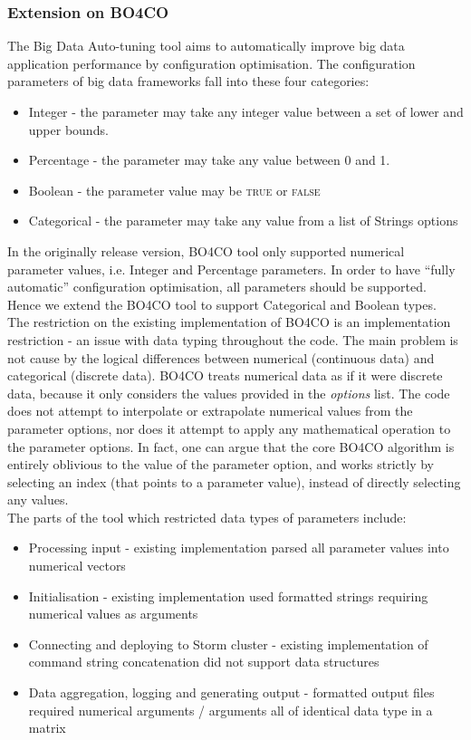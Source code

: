 \newpage
\subsubsection{Extension on BO4CO}
The Big Data Auto-tuning tool aims to automatically improve big data application performance by configuration optimisation. The configuration parameters of big data frameworks fall into these four categories:
\begin{itemize}
\item Integer - the parameter may take any integer value between a set of lower and upper bounds.
\item Percentage - the parameter may take any value between 0 and 1.
\item Boolean - the parameter value may be \textsc{true} or \textsc{false}
\item Categorical - the parameter may take any value from a list of Strings options
\end{itemize}
In the originally release version, BO4CO tool only supported numerical parameter values, i.e. Integer and Percentage parameters. In order to have ``fully automatic'' configuration optimisation, all parameters should be supported. Hence we extend the BO4CO tool to support Categorical and Boolean types.\\
The restriction on the existing implementation of BO4CO is an implementation restriction - an issue with data typing throughout the code. The main problem is not cause by the logical differences between numerical (continuous data) and categorical (discrete data). BO4CO treats numerical data as if it were discrete data, because it only considers the values provided in the \textit{options} list. The code does not attempt to interpolate or extrapolate numerical values from the parameter options, nor does it attempt to apply any mathematical operation to the parameter options. In fact, one can argue that the core BO4CO algorithm is entirely oblivious to the value of the parameter option, and works strictly by selecting an index (that points to a parameter value), instead of directly selecting any values.\\
The parts of the tool which restricted data types of parameters include:
\begin{itemize}
\item Processing input - existing implementation parsed all parameter values into numerical vectors
\item Initialisation - existing implementation used formatted strings requiring numerical values as arguments
\item Connecting and deploying to Storm cluster - existing implementation of command string concatenation did not support data structures
\item Data aggregation, logging and generating output - formatted output files required numerical arguments / arguments all of identical data type in a matrix
\end{itemize}
